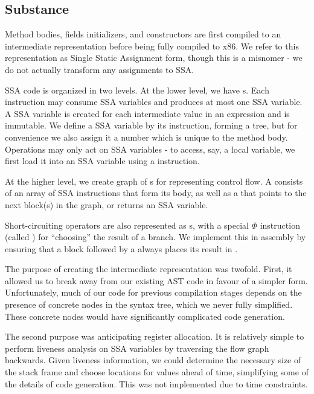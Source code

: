 \documentclass[pdftex,10pt,a4paper]{article}
\begin{document}
\subsection{Substance}

Method bodies, fields initializers, and constructors are first compiled to an
intermediate representation before being fully compiled to x86. We refer to this
representation as Single Static Assignment form, though this is a misnomer - we
do not actually transform any assignments to SSA.

SSA code is organized in two levels. At the lower level, we have
s. Each instruction may consume SSA variables and produces at
most one SSA variable. A SSA variable is created for each intermediate value in
an expression and is immutable. We define a SSA variable by its instruction,
forming a tree, but for convenience we also assign it a number which is unique to
the method body. Operations may only act on SSA variables - to access, say, a
local variable, we first load it into an SSA variable using a 
instruction.

At the higher level, we create graph of s for representing
control flow. A  consists of an array of SSA instructions that
form its body, as well as a  that points to the next block(s)
in the graph, or returns an SSA variable.

Short-circuiting operators are also represented as s, with a
special $\Phi$ instruction (called ) for ``choosing'' the result of a
branch. We implement this in assembly by ensuring that a block followed by a
 always places its result in .

The purpose of creating the intermediate representation was twofold. First, it
allowed us to break away from our existing AST code in favour of a simpler form.
Unfortunately, much of our code for previous compilation stages depends on the
presence of concrete nodes in the syntax tree, which we never fully simplified.
These concrete nodes would have significantly complicated code generation.

The second purpose was anticipating register allocation. It is relatively simple
to perform liveness analysis on SSA variables by traversing the flow graph
backwards. Given liveness information, we could determine the necessary size of
the stack frame and choose locations for values ahead of time, simplifying some
of the details of code generation. This was not implemented due to time
constraints.
\end{document}
